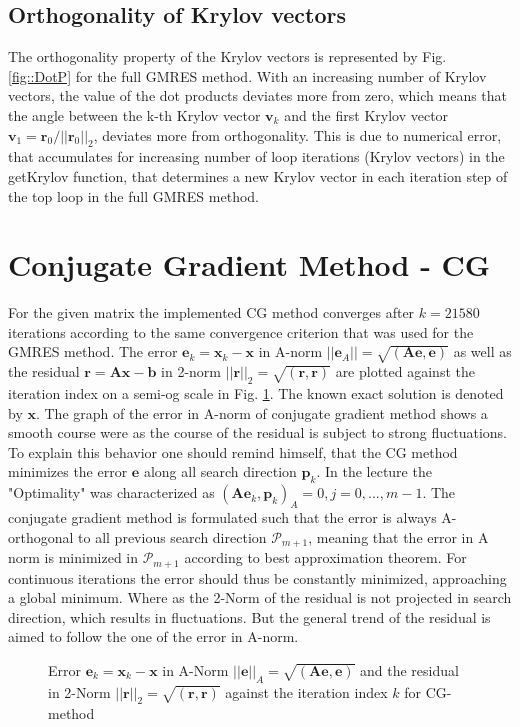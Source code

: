 \documentclass[11pt,a4paper]{article}
\newcommand{\refFig}[1]{Fig. \ref{#1}}
\begin{document}
\subsection{Orthogonality of Krylov vectors}
The orthogonality property of the Krylov vectors is represented by \refFig{fig::DotP} for the full GMRES method. With an increasing number of Krylov vectors, the value of the dot products deviates more from zero, which means that the angle between the k-th Krylov vector $\mathbf{v}_k$ and the first Krylov vector $\mathbf{v}_1 = \mathbf{r}_0 / ||\mathbf{r}_0||_2$, deviates more from orthogonality. This is due to numerical error, that accumulates for increasing number of loop iterations (Krylov vectors) in the getKrylov function, that determines a new Krylov vector in each iteration step of the top loop in the full GMRES method.

\newpage
\section{Conjugate Gradient Method - CG}
\label{chapter:CG}

For the given matrix the implemented CG method converges after $k = 21580$ iterations according to the same convergence criterion that was used for the GMRES method.
The error $\mathbf{e}_k = \mathbf{x}_k - \mathbf{x}$ in A-norm $||\mathbf{e}_A|| = \sqrt{(\mathbf{Ae}, \mathbf{e})}$ as well as the residual $\mathbf{r} = \mathbf{Ax} - \mathbf{b}$ in 2-norm $||\mathbf{r}||_2 = \sqrt{(\mathbf{r}, \mathbf{r})}$ are plotted against the iteration index on a semi-og scale in \refFig{fig::CGNorms}. The known exact solution is denoted by $\mathbf{x}$. The graph of the error in A-norm of conjugate gradient method  shows a smooth course were as the course of the residual is subject to strong fluctuations. To explain this behavior one should remind himself, that the CG method minimizes the error $\mathbf{e}$ along all search direction $\mathbf{p}_k$. In the lecture the "Optimality" was characterized as $(\mathbf{Ae}_k, \mathbf{p}_k)_A = 0, j = 0,...,m-1$. The conjugate gradient method is formulated such that the error is always A-orthogonal to all previous search direction $\mathcal{P}_{m+1}$, meaning that the error in A norm is minimized in $\mathcal{P}_{m+1}$ according to best approximation theorem. For continuous iterations the error should thus be constantly minimized, approaching a global minimum. Where as the 2-Norm of the residual is not projected in search direction, which results in fluctuations. But the general trend of the residual is aimed to follow the one of the error in A-norm.

\begin{figure}[!htbp]
	\centering
	\hspace*{0.8cm}
	\leavevmode
	\resizebox{0.9\width}{!}{}
	\caption{Error $\mathbf{e}_k = \mathbf{x}_k - \mathbf{x} $ in A-Norm $||\mathbf{e}||_A = \sqrt{(\mathbf{Ae}, \mathbf{e})}$ and the residual in 2-Norm $||\mathbf{r}||_2 = \sqrt{(\mathbf{r}, \mathbf{r})}$ against the iteration index $k$ for CG-method}
	\label{fig::CGNorms}
\end{figure}
\end{document}
